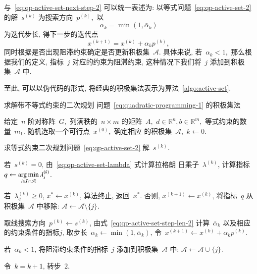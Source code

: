 与~\eqref{eq:qp-active-set-next-step-2} 可以统一表述为: 以等式问题~\eqref{eq:qp-active-set-2}
的解~${s}^{(k)}$ 为搜索方向~${p}^{(k)},$ 以
\begin{equation}
\label{eq:qp-active-set-step-len-uniform}
\alpha_k = \min (1, \bar{\alpha}_k)
\end{equation}
为迭代步长, 得下一步的迭代点
\begin{equation}
\label{eq:qp-active-set-next-step-uniform}
{x}^{(k+1)} = {x}^{(k)} + \alpha_k {p}^{(k)},
\end{equation}
同时根据是否出现阻滞约束确定是否更新积极集~$\mathcal{A}.$ 具体来说, 若~$\alpha_k < 1,$ 那么根据我们的定义, 指标~$j$ 对应的约束为阻滞约束, 这种情况下我们将~$j$ 添加到积极集~$\mathcal{A}$ 中.

至此, 可以以伪代码的形式, 将经典的积极集法表示为算法~\ref{algo:active-set}.
\begin{algorithm}[htbp]
\caption{求解带不等式约束的二次规划
问题~\eqref{eq:quadratic-programming-1} 的积极集法}\label{algo:active-set}
\begin{algorithmic}[1]
\STATE 给定~$n$ 阶对称阵~$G,$ 列满秩的~$n \times m$ 的矩阵~$A,$ ${d} \in \mathbb{R}^n, {b} \in \mathbb{R}^m,$ 等式约束的数量~$m_1$. 随机选取一个可行点~${x}^{(0)},$ 确定相应
的积极集~$\mathcal{A},$ $k \gets 0.$

\STATE 求等式约束二次规划问题~\eqref{eq:qp-active-set-2} 解~${s}^{(k)}$.

\STATE 若~${s}^{(k)} = 0$, 由~\eqref{eq:qp-active-set-lambda} 式计算拉格朗
日乘子~${\lambda}^{(k)}$, 计算指标~$q \gets \operatorname*{arg\,min}\limits_{i \in \mathcal{I} \cap \mathcal{A}} \lambda_i^{(k)}$.

\STATE 若~$\lambda^{(k)}_q \geqslant 0$, ${x}^* \gets {x}^{(k)}$, 算法终止, 返回~${x}^*$. 否则, ${x}^{(k+1)} \gets {x}^{(k)}$, 将指标~$q$ 从积极集~$\mathcal{A}$ 中移除: $\mathcal{A} \gets \mathcal{A} \setminus \{ j \}$.

\STATE 取线搜索方向~${p}^{(k)} \gets {s}^{(k)}$, 由式~\eqref{eq:qp-active-set-step-len-2}
计算~$\bar{\alpha}_k$ 以及相应的约束条件的指标$j$, 取步长~$\alpha_k \gets \min (1, \bar{\alpha}_k)$, 令~${x}^{(k+1)} \gets {x}^{(k)} + \alpha_k {p}^{(k)}$.


\STATE 若~$\alpha_k < 1$, 将阻滞约束条件的指标~$j$ 添加到积极集~$\mathcal{A}$ 中: $\mathcal{A} \gets \mathcal{A} \cup \{ j \}$.

\STATE 令~$k=k+1$, 转步~2.
\end{algorithmic}
\end{algorithm}

